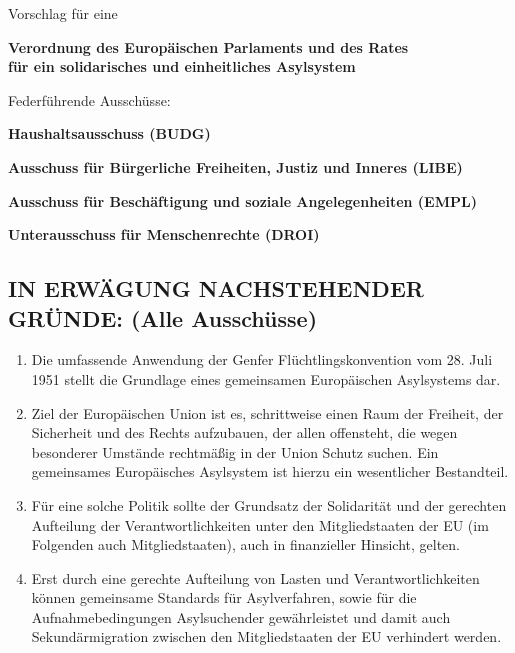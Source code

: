 \documentclass[12pt,a4paper]{article}
\title{}
\author{}
\date{}
\begin{document}
\thispagestyle{empty}

\vspace*{2cm}

\begin{center}
\Large
Vorschlag für eine

\vspace{0.8cm}

\textbf{\large Verordnung des Europäischen Parlaments und des Rates\\[0.3em]
für ein solidarisches und einheitliches Asylsystem}

\vspace{2cm}

\normalsize
Federführende Ausschüsse:

\vspace{0.5cm}

\textbf{Haushaltsausschuss (BUDG)}

\textbf{Ausschuss für Bürgerliche Freiheiten, Justiz und Inneres (LIBE)}

\textbf{Ausschuss für Beschäftigung und soziale Angelegenheiten (EMPL)}

\textbf{Unterausschuss für Menschenrechte (DROI)}

\end{center}

\PlaceLogosOne


\newpage

\subsection*{IN ERWÄGUNG NACHSTEHENDER GRÜNDE: (Alle Ausschüsse)}

\begin{enumerate}[label=(\arabic*), leftmargin=2em, itemsep=8pt]
    \item Die umfassende Anwendung der Genfer Flüchtlingskonvention vom 28. Juli 1951 stellt die Grundlage eines gemeinsamen Europäischen Asylsystems dar.

    \item Ziel der Europäischen Union ist es, schrittweise einen Raum der Freiheit, der Sicherheit und des Rechts aufzubauen, der allen offensteht, die wegen besonderer Umstände rechtmäßig in der Union Schutz suchen. Ein gemeinsames Europäisches Asylsystem ist hierzu ein wesentlicher Bestandteil.

    \item Für eine solche Politik sollte der Grundsatz der Solidarität und der gerechten Aufteilung der Verantwortlichkeiten unter den Mitgliedstaaten der EU (im Folgenden auch Mitgliedstaaten), auch in finanzieller Hinsicht, gelten.

    \item Erst durch eine gerechte Aufteilung von Lasten und Verantwortlichkeiten können gemeinsame Standards für Asylverfahren, sowie für die Aufnahmebedingungen Asylsuchender gewährleistet und damit auch Sekundärmigration zwischen den Mitgliedstaaten der EU verhindert werden.
\end{enumerate}
\end{document}
